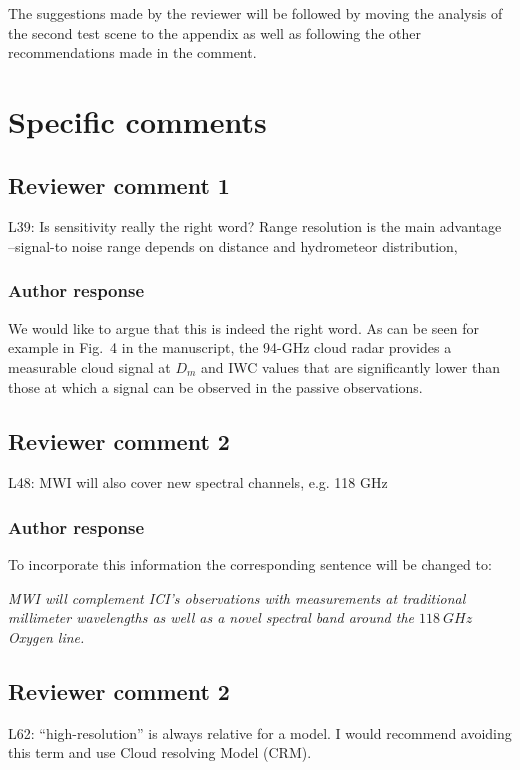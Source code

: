 \documentclass[11pt]{scrartcl}
\begin{document}
The suggestions made by the reviewer will be followed by moving the analysis of
the second test scene to the appendix as well as following the other recommendations
made in the comment.

\section{Specific comments}
\subsection*{Reviewer comment 1}
L39:  Is sensitivity really the right word?   Range resolution is the main advantage –signal-to noise range depends on distance and hydrometeor distribution,

\subsubsection*{Author response}

We would like to argue that this is indeed the right word. As can be seen for
example in Fig.~4 in the manuscript, the 94-GHz cloud radar provides a
measurable cloud signal at $D_m$ and IWC values that are significantly lower
than those at which a signal can be observed in the passive observations.

\subsection*{Reviewer comment 2}

L48: MWI will also cover new spectral channels, e.g. 118 GHz

\subsubsection*{Author response}

To incorporate this information the corresponding sentence will be changed to:

\textit{MWI will complement ICI's observations with measurements at traditional
  millimeter wavelengths as well as a novel spectral band around the
  $118\ \unit{GHz}$ Oxygen line.}

\subsection*{Reviewer comment 2}

L62: “high-resolution” is always relative for a model. I would recommend avoiding this term and use Cloud resolving Model (CRM).
\end{document}
